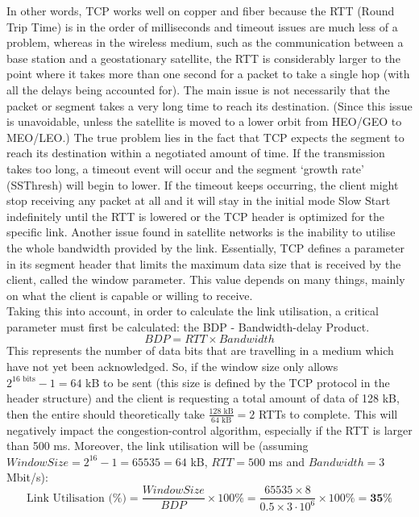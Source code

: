 In other words, TCP works well on copper and fiber because the RTT (Round Trip Time) is in the order of milliseconds and timeout issues are much less of a problem, whereas in the wireless medium, such as the communication between a base station and a geostationary satellite, the RTT is considerably larger to the point where it takes more than one second for a packet to take a single hop (with all the delays being accounted for). The main issue is not necessarily that the packet or segment takes a very long time to reach its destination. (Since this issue is unavoidable, unless the satellite is moved to a lower orbit from HEO/GEO to MEO/LEO.) The true problem lies in the fact that TCP expects the segment to reach its destination within a negotiated amount of time. If the transmission takes too long, a timeout event will occur and the segment `growth rate' (SSThresh) will begin to lower. If the timeout keeps occurring, the client might stop receiving any packet at all and it will stay in the initial mode Slow Start indefinitely until the RTT is lowered or the TCP header is optimized for the specific link. Another issue found in satellite networks is the inability to utilise the whole bandwidth provided by the link. Essentially, TCP defines a parameter in its segment header that limits the maximum data size that is received by the client, called the window parameter. This value depends on many things, mainly on what the client is capable or willing to receive.\\

Taking this into account, in order to calculate the link utilisation, a critical parameter must first be calculated: the BDP - Bandwidth-delay Product.
$$BDP = RTT\times Bandwidth$$
This represents the number of data bits that are  travelling in a medium which have not yet been acknowledged. So, if the window size only allows $2^{16 \text{ bits}} - 1 = 64$ kB to be sent (this size is defined by the TCP protocol in the header structure) and the client is requesting a total amount of data of 128 kB, then the entire  should theoretically take $\tfrac{128 \text{ kB}}{64 \text{ kB}} = 2$ RTTs to complete. This will negatively impact the congestion-control algorithm, especially if the RTT is larger than 500 ms. Moreover, the link utilisation will be (assuming $WindowSize = 2^{16}-1 = 65535 = 64$ kB, $RTT = 500$ ms and $Bandwidth = 3$ Mbit/s):
$$\text{Link Utilisation (\%)} = \dfrac{WindowSize}{BDP}\times 100\% = \dfrac{65535\times 8}{0.5\times 3\cdot10^6}\times 100\% = \mathbf{35}\%$$

